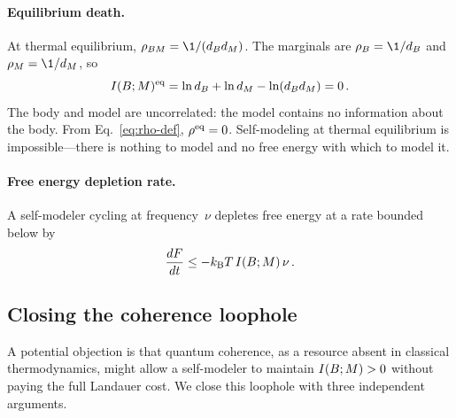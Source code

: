 \paragraph{Equilibrium death.}
At thermal equilibrium, $\rho_{BM} = \1/(d_B d_M)$.  The marginals
are $\rho_B = \1/d_B$ and $\rho_M = \1/d_M$, so
\begin{equation}
  I(B;M)^{\mathrm{eq}}
  = \ln d_B + \ln d_M - \ln(d_B d_M) = 0 \,.
  \label{eq:eq-mutual}
\end{equation}
The body and model are uncorrelated: the model contains no
information about the body.  From Eq.~\eqref{eq:rho-def},
$\rho^{\mathrm{eq}} = 0$.  Self-modeling at thermal equilibrium
is impossible---there is nothing to model and no free energy with
which to model it.

\paragraph{Free energy depletion rate.}
A self-modeler cycling at frequency~$\nu$ depletes free energy at a
rate bounded below by
\begin{equation}
  \frac{dF}{dt} \leq -k_{\mathrm{B}} T\,I(B;M)\,\nu \,.
  \label{eq:depletion}
\end{equation}

\subsection{Closing the coherence loophole}\label{sec:coherence}

A potential objection is that quantum coherence, as a resource absent
in classical thermodynamics, might allow a self-modeler to maintain
$I(B;M) > 0$ without paying the full Landauer cost.  We close
this loophole with three independent arguments.

